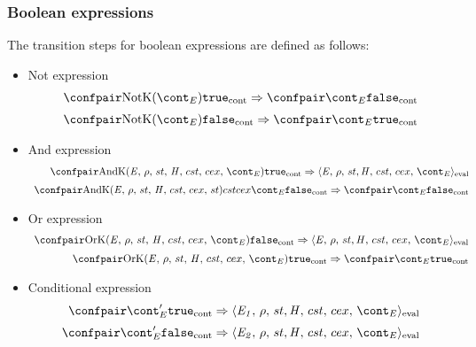 \documentclass{article}
\newcommand{\cesktrans}[2]{\ensuremath{{#1} \Rightarrow {#2}}}
\begin{document}
\subsubsection{Boolean expressions}
\label{subsubsec:bool-expressions}
\newcommand{\true}{\tt{true}}
\newcommand{\false}{\tt{false}}


The transition steps for boolean expressions are defined as follows:
\begin{itemize}
\item Not expression\\
\[
  \begin{array}{rll}
	\cesktrans{
		\contconf{\NotK{\econt}}{\true}}{
		\contconf{\econt}{\false}}
		\\[2mm]

	\cesktrans{
		\contconf{\NotK{\econt}}{\false}}{
		\contconf{\econt}{\true}}
  \end{array}
\]
\item And expression\\
\[
  \begin{array}{rcl}
	\cesktrans{
		\contconf{\AndK{\expressionmeta}{\env}{\econt}}{\true}}{
		\evalconf{\expressionmeta}{\env}{\strace}{\cstrace}{\cex}{\econt}}
		\\[2mm]

	\cesktrans{
		\contconf{\AndK{\expressionmeta}{\env}{\strace}{\cstrace}{\cex}{\econt}}{\false}}{
		\contconf{\econt}{\false}}
  \end{array}
\]
\item Or expression\\
\[
  \begin{array}{rcl}
	\cesktrans{
		\contconf{\OrK{\expressionmeta}{\env}{\econt}}{\false}}{
		\evalconf{\expressionmeta}{\env}{\strace}{\cstrace}{\cex}{\econt}}
		\\[2mm]

	\cesktrans{
		\contconf{\OrK{\expressionmeta}{\env}{\econt}}{\true}}{
		\contconf{\econt}{\true}}
  \end{array}
\]
\item Conditional expression\\
\[
  \begin{array}{rcl}
	\cesktrans{
		\contconf{\econt'}{\true}}{
		\evalconf{\expri{1}}{\env}{\strace}{\cstrace}{\cex}{\econt}}
		\\[2mm]

	\cesktrans{
		\contconf{\econt'}{\false}}{
		\evalconf{\expri{2}}{\env}{\strace}{\cstrace}{\cex}{\econt}}
		\\[2mm]
  \end{array}
\]

\end{itemize}
\end{document}
